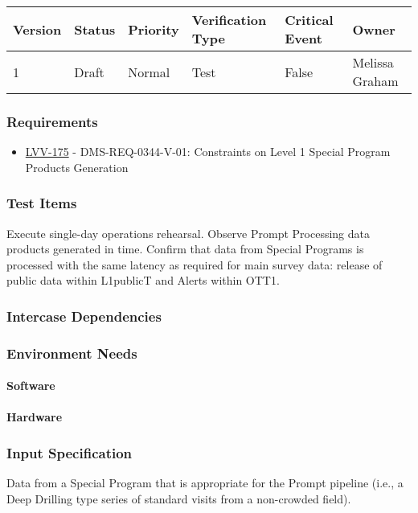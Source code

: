 \begin{longtable}[]{llllll}
\toprule
Version & Status & Priority & Verification Type & Critical Event & Owner
\\\midrule
1 & Draft & Normal &
Test & False & Melissa Graham
\\\bottomrule
\end{longtable}

\subsubsection{Requirements}
\begin{itemize}
\item \href{https://jira.lsstcorp.org/browse/LVV-175}{LVV-175} - DMS-REQ-0344-V-01: Constraints on Level 1 Special Program Products Generation
\end{itemize}

\subsubsection{Test Items}
Execute single-day operations rehearsal. Observe Prompt Processing data
products generated in time. Confirm that data from Special Programs is
processed with the same latency as required for main survey data:
release of public data within L1publicT and Alerts within OTT1.



\subsubsection{Intercase Dependencies}

\subsubsection{Environment Needs}

\paragraph{Software}

\paragraph{Hardware}

\subsubsection{Input Specification}
Data from a Special Program that is appropriate for the Prompt pipeline
(i.e., a Deep Drilling type series of standard visits from a non-crowded
field).


